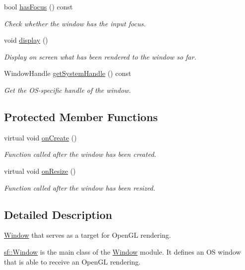 \begin{DoxyCompactItemize}
bool \hyperlink{classsf_1_1_window_ad8db2e6500d13ca9396281296404ba31}{has\+Focus} () const
\begin{DoxyCompactList}\small\item\em Check whether the window has the input focus. \end{DoxyCompactList}\item 
void \hyperlink{classsf_1_1_window_adabf839cb103ac96cfc82f781638772a}{display} ()
\begin{DoxyCompactList}\small\item\em Display on screen what has been rendered to the window so far. \end{DoxyCompactList}\item 
Window\+Handle \hyperlink{classsf_1_1_window_ad2fa6be5104ec0bfe79af7a5f524ea90}{get\+System\+Handle} () const
\begin{DoxyCompactList}\small\item\em Get the O\+S-\/specific handle of the window. \end{DoxyCompactList}\end{DoxyCompactItemize}
\subsection*{Protected Member Functions}
\begin{DoxyCompactItemize}
\item 
virtual void \hyperlink{classsf_1_1_window_a106633b9be49b27f83d4712689b493eb}{on\+Create} ()
\begin{DoxyCompactList}\small\item\em Function called after the window has been created. \end{DoxyCompactList}\item 
virtual void \hyperlink{classsf_1_1_window_a10f567a387da7b49f417f73321fcf64d}{on\+Resize} ()
\begin{DoxyCompactList}\small\item\em Function called after the window has been resized. \end{DoxyCompactList}\end{DoxyCompactItemize}


\subsection{Detailed Description}
\hyperlink{classsf_1_1_window}{Window} that serves as a target for Open\+GL rendering. 

\hyperlink{classsf_1_1_window}{sf\+::\+Window} is the main class of the \hyperlink{classsf_1_1_window}{Window} module. It defines an OS window that is able to receive an Open\+GL rendering.

